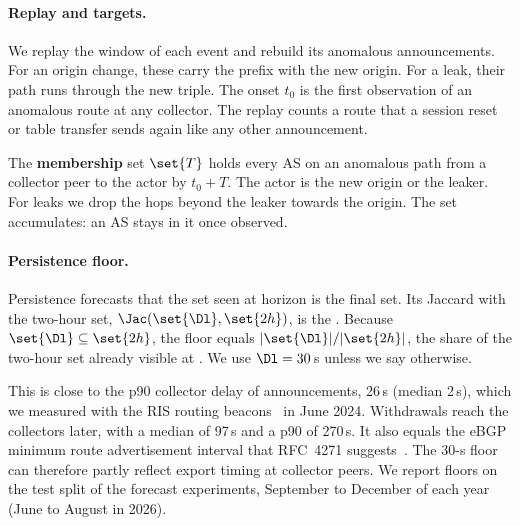 \paragraph{Replay and targets.}
We replay the window of each event and rebuild its anomalous announcements.
For an origin change, these carry the prefix with the new origin.
For a leak, their path runs through the new triple.
The onset $t_0$ is the first observation of an anomalous route at any collector.
The replay counts a route that a session reset or table transfer sends again like any other announcement.

The \textbf{membership} set $\set{T}$ holds every AS on an anomalous path from a collector peer to the actor by $t_0+T$.
The actor is the new origin or the leaker.
For leaks we drop the hops beyond the leaker towards the origin.
The set accumulates: an AS stays in it once observed.

\paragraph{Persistence floor.}
Persistence forecasts that the set seen at horizon \Dl is the final set.
Its Jaccard with the two-hour set, $\Jac(\set{\Dl},\set{2h})$, is the \floor.
Because $\set{\Dl}\subseteq\set{2h}$, the floor equals $|\set{\Dl}|/|\set{2h}|$, the share of the two-hour set already visible at \Dl.
We use $\Dl=30$\,s unless we say otherwise.

This is close to the p90 collector delay of announcements, 26\,s (median 2\,s), which we measured with the RIS routing beacons~\cite{ripe_ris_routing_beacons} in June 2024.
Withdrawals reach the collectors later, with a median of 97\,s and a p90 of 270\,s.
It also equals the eBGP minimum route advertisement interval that RFC~4271 suggests~\cite{rfc4271}.
The 30-s floor can therefore partly reflect export timing at collector peers.
We report floors on the test split of the forecast experiments, September to December of each year (June to August in 2026).
